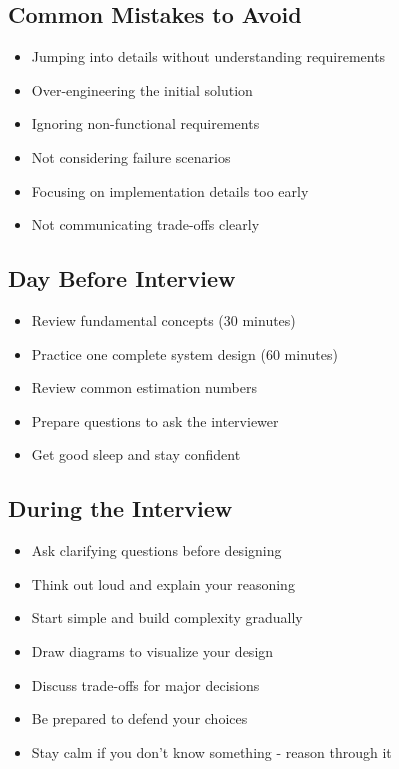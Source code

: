 \documentclass[10pt,a4paper]{article}
\begin{document}
\subsection{Common Mistakes to Avoid}
\begin{itemize}
\item Jumping into details without understanding requirements
\item Over-engineering the initial solution
\item Ignoring non-functional requirements
\item Not considering failure scenarios
\item Focusing on implementation details too early
\item Not communicating trade-offs clearly
\end{itemize}

\subsection{Day Before Interview}
\begin{itemize}
\item Review fundamental concepts (30 minutes)
\item Practice one complete system design (60 minutes)
\item Review common estimation numbers
\item Prepare questions to ask the interviewer
\item Get good sleep and stay confident
\end{itemize}

\subsection{During the Interview}
\begin{itemize}
\item Ask clarifying questions before designing
\item Think out loud and explain your reasoning
\item Start simple and build complexity gradually
\item Draw diagrams to visualize your design
\item Discuss trade-offs for major decisions
\item Be prepared to defend your choices
\item Stay calm if you don't know something - reason through it
\end{itemize}
\end{document}
